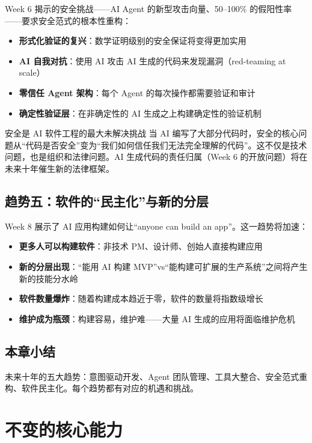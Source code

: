 \documentclass[a4paper]{article}
\begin{document}
Week 6 揭示的安全挑战——AI Agent 的新型攻击向量、50--100\% 的假阳性率——要求安全范式的根本性重构：

\begin{itemize}
    \item \textbf{形式化验证的复兴}：数学证明级别的安全保证将变得更加实用
    \item \textbf{AI 自我对抗}：使用 AI 攻击 AI 生成的代码来发现漏洞（red-teaming at scale）
    \item \textbf{零信任 Agent 架构}：每个 Agent 的每次操作都需要验证和审计
    \item \textbf{确定性验证层}：在非确定性的 AI 生成之上构建确定性的验证机制
\end{itemize}

\begin{warningbox}{安全是 AI 软件工程的最大未解决挑战}
当 AI 编写了大部分代码时，安全的核心问题从``代码是否安全''变为``我们如何信任我们无法完全理解的代码''。这不仅是技术问题，也是组织和法律问题。AI 生成代码的责任归属（Week 6 的开放问题）将在未来十年催生新的法律框架。
\end{warningbox}

\subsection{趋势五：软件的``民主化''与新的分层}

Week 8 展示了 AI 应用构建如何让``anyone can build an app''。这一趋势将加速：

\begin{itemize}
    \item \textbf{更多人可以构建软件}：非技术 PM、设计师、创始人直接构建应用
    \item \textbf{新的分层出现}：``能用 AI 构建 MVP''vs``能构建可扩展的生产系统''之间将产生新的技能分水岭
    \item \textbf{软件数量爆炸}：随着构建成本趋近于零，软件的数量将指数级增长
    \item \textbf{维护成为瓶颈}：构建容易，维护难——大量 AI 生成的应用将面临维护危机
\end{itemize}

\subsection{本章小结}

未来十年的五大趋势：意图驱动开发、Agent 团队管理、工具大整合、安全范式重构、软件民主化。每个趋势都有对应的机遇和挑战。

\section{不变的核心能力}
\end{document}
